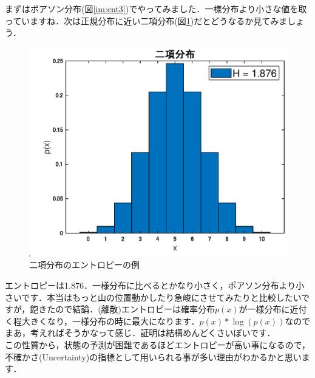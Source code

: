 \documentclass[11pt,a4paper,dvipdfmx]{ujreport}
\begin{document}
まずはポアソン分布(図\ref{im:ent3})でやってみました．一様分布より小さな値を取っていますね．次は正規分布に近い二項分布(図\ref{im:ent4})だとどうなるか見てみましょう．

\begin{figure}[H]
\label{im:ent4}
  \centering
  \includegraphics[width=15cm]{../figures/ent_bi.eps}
  \caption{二項分布のエントロピーの例}
\end{figure}

エントロピーは1.876．一様分布に比べるとかなり小さく，ポアソン分布より小さいです．本当はもっと山の位置動かしたり急峻にさせてみたりと比較したいですが，飽きたので結論．(離散)エントロピーは確率分布$p(x)$が一様分布に近付く程大きくなり，一様分布の時に最大になります．$p(x) * \log(p(x))$なのでまあ，考えればそうかなって感じ．証明は結構めんどくさいぽいです．\\

この性質から，状態の予測が困難であるほどエントロピーが高い事になるので，不確かさ(Uncertainty)の指標として用いられる事が多い理由がわかるかと思います．\\
\\
\end{document}
